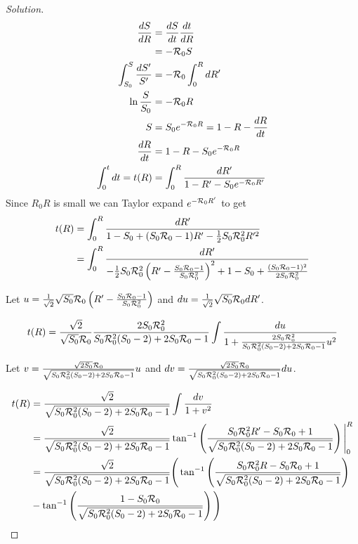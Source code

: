 \documentclass[12pt]{article}
\begin{document}
\begin{enumerate}[(a)]
\begin{enumerate}[(i)]
{\color{blue}
\begin{proof}[Solution]
{\color{magenta}

	\begin{align}
		\frac{dS}{dR} &= \frac{dS}{dt} \frac{dt}{dR} \\
				     &= -{\cal R}_0 S \\
		\int_{S_0}^{S} \frac{dS'}{S'} &= -{\cal R}_0 \int_{0}^{R} dR' \\
		\ln{\frac{S}{S_0}} &= -{\cal R}_0 R \\
		S &= S_0 e^{-{\cal R}_0 R} = 1 - R - \frac{dR}{dt} \\
		\frac{dR}{dt} &= 1 - R - S_0 e^{-{\cal R}_0 R} \\
		\int_{0}^{t} dt = t(R) &= \int_{0}^{R} \frac{dR'}{1 - R' - S_0 e^{-{\cal R}_0 R'}}
	\end{align}
	Since $R_0 R$ is small we can Taylor expand $e^{-{\cal R}_0 R'}$ to get
	\begin{align}
		t(R) &= \int_{0}^{R} \frac{dR'}{1 - S_0 + (S_0{\cal R}_0 -1)R' -\frac{1}{2}S_0{\cal R}_0^2R'^2} \\
		&= \int_{0}^{R} \frac{dR'}{-\frac{1}{2}S_0{\cal R}_0^2 \left (R^\prime - \frac{S_0{\cal R}_0 - 1}{S_0{\cal R}_0^2}  \right )^2  +1-S_0+\frac{(S_0{\cal R}_0 -1)^2}	{2S_0{\cal R}_0^2}  }
	\end{align}
	
	Let $u=\frac{1}{\sqrt{2}}\sqrt{S_0}{\cal R}_0 \left (R' - \frac{S_0{\cal R}_0 - 1}{S_0{\cal R}_0^2}  \right )$ and $du=\frac{1}{\sqrt{2}}\sqrt{S_0}{\cal R}_0 dR'$.
	
	\begin{equation}
		t(R) =\frac{\sqrt{2}}{\sqrt{S_0}{\cal R}_0} \frac{2S_0{\cal R}_0^2}{S_0{\cal R}_0^2(S_0-2)+2S_0{\cal R}_0 -1} \int \frac{du}{1+\frac{2S_0{\cal R}_0^2}{S_0{\cal R}_0^2(S_0-2)+2S_0{\cal R}_0 -1}u^2} 
	\end{equation}
	
	Let $v=\frac{\sqrt{2S_0}{\cal R}_0}{\sqrt{S_0{\cal R}_0^2(S_0-2)+2S_0{\cal R}_0 -1}}u$ and $dv=\frac{\sqrt{2S_0}{\cal R}_0}{\sqrt{S_0{\cal R}_0^2(S_0-2)+2S_0{\cal R}_0 -1}}du$.
	
	\begin{align}
		t(R) &= \frac{\sqrt{2}}{\sqrt{S_0{\cal R}_0^2(S_0-2)+2S_0{\cal R}_0 -1}} \int \frac{dv}{1+v^2}  \\
		&= \frac{\sqrt{2}}{\sqrt{S_0{\cal R}_0^2(S_0-2)+2S_0{\cal R}_0 -1}} \tan ^{-1} \left ( \frac{S_0{\cal R}_0^2R' - S_0{\cal R}_0 +1}{\sqrt{S_0{\cal R}_0^2(S_0-2)+2S_0{\cal R}_0 -1}} \right ) \Bigg |_0^R \\
		&= \frac{\sqrt{2}}{\sqrt{S_0{\cal R}_0^2(S_0-2)+2S_0{\cal R}_0 -1}} \Bigg ( \tan ^{-1} \left ( \frac{S_0{\cal R}_0^2R - S_0{\cal R}_0 +1}{\sqrt{S_0{\cal R}_0^2(S_0-2)+2S_0{\cal R}_0 -1}} \right ) \nonumber \\
		&-\tan ^{-1} \left ( \frac{1 - S_0{\cal R}_0 }{\sqrt{S_0{\cal R}_0^2(S_0-2)+2S_0{\cal R}_0 -1}} \right )  \Bigg ) 
	\end{align}

}
\end{proof}}
\end{enumerate}
\end{enumerate}
\end{document}
